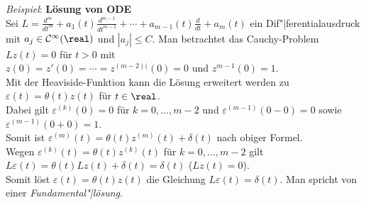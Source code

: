 \linie

\emph{Beispiel}:
\textbf{Lösung von ODE}\\
Sei $L = \frac{d^m}{dt^m} + a_1(t) \frac{d^{m-1}}{dt^{m-1}} + \dotsb +
a_{m-1}(t) \frac{d}{dt} + a_m(t)$ ein Dif"|ferentialausdruck mit
$a_j \in \C^\infty(\real)$ und $|a_j| \le C$.
Man betrachtet das Cauchy-Problem $Lz(t) = 0$ für $t > 0$ mit\\
$z(0) = z'(0) = \dotsb = z^{(m-2)(}(0) = 0$ und $z^{m-1}(0) = 1$.\\
Mit der Heaviside-Funktion kann die Lösung erweitert werden zu
$\varepsilon(t) = \theta(t) z(t)$ für $t \in \real$.\\
Dabei gilt $\varepsilon^{(k)}(0) = 0$ für $k = 0, \dotsc, m - 2$ und
$\varepsilon^{(m-1)}(0 - 0) = 0$ sowie $\varepsilon^{(m-1)}(0 + 0) = 1$.\\
Somit ist $\varepsilon^{(m)}(t) = \theta(t) z^{(m)}(t) + \delta(t)$
nach obiger Formel.\\
Wegen $\varepsilon^{(k)}(t) = \theta(t) z^{(k)}(t)$ für $k = 0, \dotsc, m - 2$
gilt $L\varepsilon(t) = \theta(t) Lz(t) + \delta(t) = \delta(t)$
($Lz(t) = 0$).\\
Somit löst $\varepsilon(t) = \theta(t) z(t)$ die Gleichung
$L\varepsilon(t) = \delta(t)$.
Man spricht von einer \emph{Fundamental"|lösung}.

\linie

